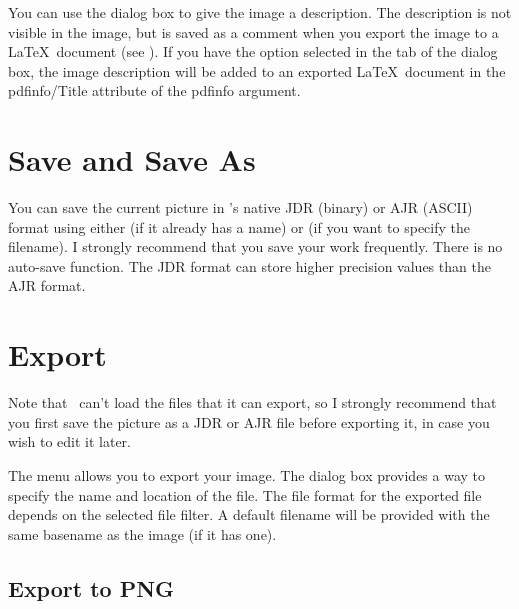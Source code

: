 You can use the  dialog box to give the
image a description. The description is not visible in the image,
but is saved as a comment when you export the image to a \LaTeX\
document (see ). If you have the
 option selected in the
 tab of the  dialog box,
the image description will be added to an exported \LaTeX\ document
in the \gls{pdfinfo/Title} attribute of the \gls{pdfinfo} argument.

\section{Save and Save As}\label{sec:saveimage}


You can save the current picture in \FlowframTk's native
\gls{JDR} (binary) or \gls{AJR} (ASCII) format using either
 (if it already has a name)
or  (if you want to specify the
filename).  I strongly recommend that you save your work frequently.
There is no auto-save function. The \gls{JDR} format can store
higher precision values than the \gls{AJR} format.

\section{Export}\label{sec:exportimage}


\begin{warning}
Note that \FlowframTk\ can't load the files that it can export, so I
strongly recommend that you first save the picture as a
\gls{JDR} or \gls{AJR} file before exporting it, in case you
wish to edit it later.
\end{warning}

The  menu allows you to export your image. The
\inlineglsdef{export.title} dialog box provides a way to specify the name
and location of the file.  The file format for the exported file
depends on the selected file filter.  A default filename will be
provided with the same basename as the image (if it has one).

\subsection{Export to PNG}\label{sec:exportpng}

